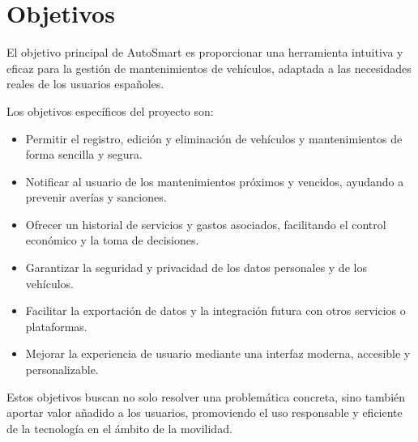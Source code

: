 \chapter{Objetivos}

El objetivo principal de AutoSmart es proporcionar una herramienta intuitiva y eficaz para la gestión de mantenimientos de vehículos, adaptada a las necesidades reales de los usuarios españoles.

Los objetivos específicos del proyecto son:

\begin{itemize}
    \item Permitir el registro, edición y eliminación de vehículos y mantenimientos de forma sencilla y segura.
    \item Notificar al usuario de los mantenimientos próximos y vencidos, ayudando a prevenir averías y sanciones.
    \item Ofrecer un historial de servicios y gastos asociados, facilitando el control económico y la toma de decisiones.
    \item Garantizar la seguridad y privacidad de los datos personales y de los vehículos.
    \item Facilitar la exportación de datos y la integración futura con otros servicios o plataformas.
    \item Mejorar la experiencia de usuario mediante una interfaz moderna, accesible y personalizable.
\end{itemize}

Estos objetivos buscan no solo resolver una problemática concreta, sino también aportar valor añadido a los usuarios, promoviendo el uso responsable y eficiente de la tecnología en el ámbito de la movilidad. 